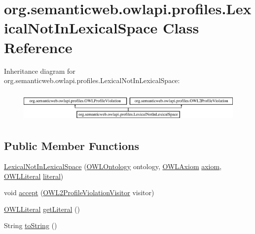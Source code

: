 \hypertarget{classorg_1_1semanticweb_1_1owlapi_1_1profiles_1_1_lexical_not_in_lexical_space}{\section{org.\-semanticweb.\-owlapi.\-profiles.\-Lexical\-Not\-In\-Lexical\-Space Class Reference}
\label{classorg_1_1semanticweb_1_1owlapi_1_1profiles_1_1_lexical_not_in_lexical_space}
}
Inheritance diagram for org.\-semanticweb.\-owlapi.\-profiles.\-Lexical\-Not\-In\-Lexical\-Space\-:\begin{figure}[H]
\begin{center}
\leavevmode
\includegraphics[height=1.600000cm]{classorg_1_1semanticweb_1_1owlapi_1_1profiles_1_1_lexical_not_in_lexical_space}
\end{center}
\end{figure}
\subsection*{Public Member Functions}
\begin{DoxyCompactItemize}
\item 
\hyperlink{classorg_1_1semanticweb_1_1owlapi_1_1profiles_1_1_lexical_not_in_lexical_space_a70e52eac5ec35d7aa8715f1f4ee8397b}{Lexical\-Not\-In\-Lexical\-Space} (\hyperlink{interfaceorg_1_1semanticweb_1_1owlapi_1_1model_1_1_o_w_l_ontology}{O\-W\-L\-Ontology} ontology, \hyperlink{interfaceorg_1_1semanticweb_1_1owlapi_1_1model_1_1_o_w_l_axiom}{O\-W\-L\-Axiom} \hyperlink{classorg_1_1semanticweb_1_1owlapi_1_1profiles_1_1_o_w_l_profile_violation_aa7c8e8910ed3966f64a2c003fb516214}{axiom}, \hyperlink{interfaceorg_1_1semanticweb_1_1owlapi_1_1model_1_1_o_w_l_literal}{O\-W\-L\-Literal} \hyperlink{classorg_1_1semanticweb_1_1owlapi_1_1profiles_1_1_lexical_not_in_lexical_space_ae42efc591f30f8b4ae29b9d841777a74}{literal})
\item 
void \hyperlink{classorg_1_1semanticweb_1_1owlapi_1_1profiles_1_1_lexical_not_in_lexical_space_a8b102d22a445e3e32e139a2e1b5349de}{accept} (\hyperlink{interfaceorg_1_1semanticweb_1_1owlapi_1_1profiles_1_1_o_w_l2_profile_violation_visitor}{O\-W\-L2\-Profile\-Violation\-Visitor} visitor)
\item 
\hyperlink{interfaceorg_1_1semanticweb_1_1owlapi_1_1model_1_1_o_w_l_literal}{O\-W\-L\-Literal} \hyperlink{classorg_1_1semanticweb_1_1owlapi_1_1profiles_1_1_lexical_not_in_lexical_space_a6f73a62679f776f7f4c7f3c51bc0cbd6}{get\-Literal} ()
\item 
String \hyperlink{classorg_1_1semanticweb_1_1owlapi_1_1profiles_1_1_lexical_not_in_lexical_space_a0c37068a0f29dae030c2b321b52c2239}{to\-String} ()
\end{DoxyCompactItemize}
